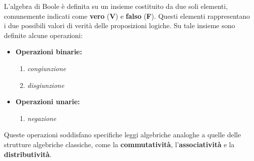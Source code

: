 L'algebra di Boole \`e definita su un insieme costituito da due soli elementi, comunemente indicati come \textbf{vero} (\textbf{V}) e \textbf{falso} (\textbf{F}).
Questi elementi rappresentano i due possibili valori di verit\`a delle proposizioni logiche.
Su tale insieme sono definite alcune operazioni:
\begin{itemize}

    \item \textbf{Operazioni binarie:}
    \begin{enumerate}[label = \alph*)]
        \item \textit{congiunzione} 
        \item \textit{disgiunzione}
    \end{enumerate}
    \item \textbf{Operazioni unarie:}
    \begin{enumerate}[label=\alph*)]
        \item \textit{negazione}
    \end{enumerate}
\end{itemize}

Queste operazioni soddisfano specifiche leggi algebriche analoghe a quelle delle strutture algebriche classiche, come la \textbf{commutatività}, l'\textbf{associatività} e la \textbf{distributività}.



